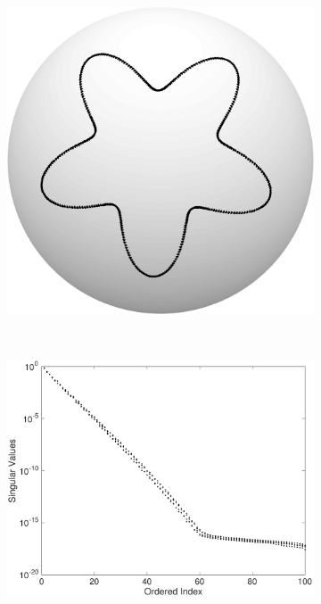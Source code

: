\documentclass{sfuthesis}
\begin{document}
\begin{figure}
	\centering
        \begin{subfigure}[b]{0.3\textwidth}
                \includegraphics[width=\textwidth]{OffDiagExContour}
                \vspace{0.2cm}
                \caption{}
                \label{fig: OffDiagExContour}
         \end{subfigure}
        ~ 
        \hspace{1cm}
        \begin{subfigure}[b]{0.5\textwidth}
                \includegraphics[width=\textwidth]{OffDiagSingValues}

\end{subfigure}
\end{figure}
\end{document}
